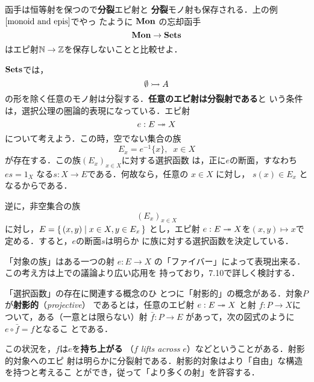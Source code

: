 函手は恒等射を保つので{\bfseries 分裂}エピ射と
{\bfseries 分裂}モノ射も保存される．上の例$\ref{monoid and epis}$でやっ
たように $\mathbf{Mon}$ の忘却函手
\[
 \mathbf{Mon} \to \mathbf{Sets}
\]
はエピ射$\mathbb{N} \to \mathbb{Z}$を保存しないことと比較せよ．

\begin{example}\label{splits and AC}
 $\mathbf{Sets}$では，
 \[
  \emptyset \rightarrowtail A
 \]
 の形を除く任意のモノ射は分裂する．{\bfseries 任意のエピ射は分裂射である}と
 いう条件は，選択公理の圏論的表現になっている．エピ射
 \[
  e: E \twoheadrightarrow X
 \]
 について考えよう．この時，空でない集合の族
 \[
  E_x = e^{-1}\{x\},\;\; x \in X
 \]
 が存在する．この族$(E_x)_{x \in X}$に対する選択函数
 は，正に$e$の断面，すなわち
 $es = 1_X$ なる$s: X \to E$である．何故なら，任意の $x \in X$ に対し，
 $s(x) \in E_x$ となるからである．

 逆に，非空集合の族
 \[
  (E_x)_{x\in X}
 \]
 に対し，$E = \set{(x, y) | x \in X, y \in E_x}$ とし，エピ射
 $e: E \twoheadrightarrow X$を$(x, y) \mapsto x$で定める．すると，$e$の断面$s$は明らか
 に族に対する選択函数を決定している．
\end{example}

「対象の族」はある一つの射 $e: E \to X$
の「ファイバー」によって表現出来る．この考え方は上での議論より広い応用を
持っており，7.10で詳しく検討する．

「選択函数」の存在に関連する概念のひ
とつに「射影的」の概念がある．対象$P$が{\bfseries 射影的}（{\itshape projective}）
であるとは，任意のエピ射
$e: E \twoheadrightarrow X$ と射 $f: P \to X$について，ある（一意とは限らない）射
$\bar f: P \to E$ があって，次の図式のように$e \circ \bar f = f$となるこ
とである．
\begin{center}
\end{center}
この状況を，$f$は$e$を{\bfseries 持ち上がる}
（$f$ {\itshape lifts across} $e$）などということがある．射影的対象へのエピ
射は明らかに分裂射である．射影的対象はより「自由」な構造を持つと考えるこ
とができ，従って「より多くの射」を許容する．

